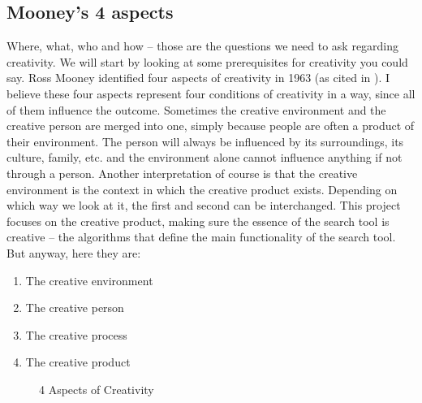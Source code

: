 \subsection{Mooney's 4 aspects}

Where, what, who and how – those are the questions we need to ask regarding creativity. We will start by looking at some prerequisites for creativity you could say. Ross Mooney identified four aspects of creativity in 1963 (as cited in \citep{Sternberg1999}). I believe these four aspects represent four conditions of creativity in a way, since all of them influence the outcome. Sometimes the creative environment and the creative person are merged into one, simply because people are often a product of their environment. The person will always be influenced by its surroundings, its culture, family, etc. and the environment alone cannot influence anything if not through a person. Another interpretation of course is that the creative environment is the context in which the creative product exists. Depending on which way we look at it, the first and second can be interchanged. This project focuses on the creative product, making sure the essence of the search tool is creative – the algorithms that define the main functionality of the search tool. But anyway, here they are:

\begin{enumerate}
  \item The creative environment
  \item The creative person
  \item The creative process
  \item The creative product
\end{enumerate}

\begin{figure}[!htb] %
  \centering
  \tikzset{every fit/.append style=text badly centered}
\caption[4 Aspects of Creativity]{4 Aspects of Creativity}
\label{fig:4Crea}
\end{figure}


